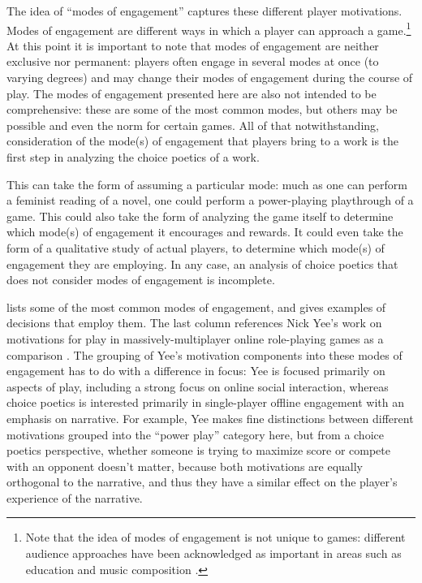 The idea of ``modes of engagement'' captures these different player motivations.
%
Modes of engagement are different ways in which a player can approach a game.\footnote{%
Note that the idea of modes of engagement is not unique to games: different audience approaches have been acknowledged as important in areas such as education and music composition \citep{Langer1995,Brown2001}.}
%
At this point it is important to note that modes of engagement are neither exclusive nor permanent: players often engage in several modes at once (to varying degrees) and may change their modes of engagement during the course of play.
%
The modes of engagement presented here are also not intended to be comprehensive: these are some of the most common modes, but others may be possible and even the norm for certain games.
%
All of that notwithstanding, consideration of the mode(s) of engagement that players bring to a work is the first step in analyzing the choice poetics of a work.


This can take the form of assuming a particular mode: much as one can perform a feminist reading of a novel, one could perform a power-playing playthrough of a game.
%
This could also take the form of analyzing the game itself to determine which mode(s) of engagement it encourages and rewards.
%
It could even take the form of a qualitative study of actual players, to determine which mode(s) of engagement they are employing.
%
In any case, an analysis of choice poetics that does not consider modes of engagement is incomplete.


 lists some of the most common modes of engagement, and gives examples of decisions that employ them.
%
The last column references Nick Yee's work on motivations for play in massively-multiplayer online role-playing games as a comparison \citep{Yee2006}.
%
The grouping of Yee's motivation components into these modes of engagement has to do with a difference in focus: Yee is focused primarily on aspects of play, including a strong focus on online social interaction, whereas choice poetics is interested primarily in single-player offline engagement with an emphasis on narrative.
%
For example, Yee makes fine distinctions between different motivations grouped into the ``power play'' category here, but from a choice poetics perspective, whether someone is trying to maximize score or compete with an opponent doesn't matter, because both motivations are equally orthogonal to the narrative, and thus they have a similar effect on the player's experience of the narrative.


